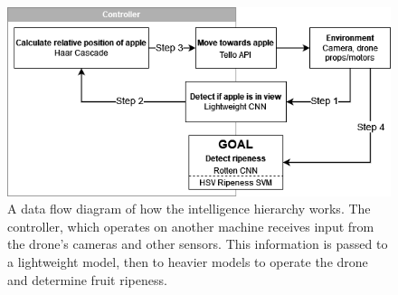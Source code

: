 \begin{figure}[!htb]
    \fontsize{7}{5}\selectfont
    \centering
    \includegraphics[width=\columnwidth,keepaspectratio]
    {./figures/fruit-fly-model-diagram}
    \caption{
        A data flow diagram of how the intelligence hierarchy works.
        The controller, which operates on another machine receives input from the drone's cameras and other sensors.
        This information is passed to a lightweight model, then to heavier models to operate the drone and determine fruit ripeness.
    }
    \label{fig:fruit-fly-model-diagram}
\end{figure}
